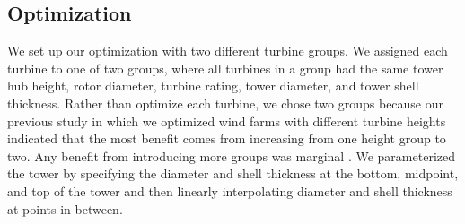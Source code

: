 \documentclass[wes, manuscript]{copernicus}
\begin{document}

%

              

	\subsection{Optimization}
	\label{sec:optimization}
	We set up our optimization with two different turbine groups. We assigned each turbine to one of two groups, where all turbines in a group had the same tower hub height, rotor diameter, turbine rating, tower diameter, and tower shell thickness.
Rather than optimize each turbine, we chose two groups because our previous study in which we optimized wind farms with different turbine heights indicated that the most benefit comes from increasing from one height group to two. Any benefit from introducing more groups was marginal \citep{stanley2018}. We parameterized the tower by specifying the diameter and shell thickness at the bottom, midpoint, and top of the tower and then linearly interpolating diameter and shell thickness at points in between. 
        
\end{document}
